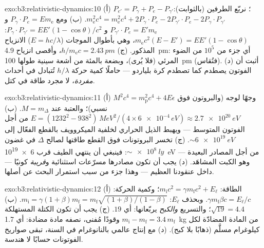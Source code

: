 \begin{solution}{exo:b3:relativistic-dynamics:10}
(أ) $P_{e'} = P_\gamma + P_e - P_{\gamma'}$؛ نربّع الطرفين
(بالثوابت): $m_{\text{e}}^2c^4 = m_{\text{e}}^2c^4 + 2P_\gamma\!
\cdot\!P_e - 2P_{\gamma'}\!\cdot\!P_e - 2P_\gamma\!\cdot\!P_{\gamma'}$.
(ب) ومع $P_\gamma\!\cdot\!P_e = E m_{\text{e}}$ و
$P_{\gamma'}\!\cdot\!P_e = E'm_{\text{e}}$ و $P_\gamma\!\cdot\!
P_{\gamma'} = EE'(1 - \cos\theta)/c^2$:
$m_{\text{e}}c^2(E - E') = EE'(1 - \cos\theta)$، وهي بأطوال الموجات
($E = hc/\lambda$) الانزياح المذكور. (ج) $h/m_{\text{e}}c =
\qty{2.43}{pm}$، وأقصى انزياح \qty{4.9}{pm}: أي جزء من $10^5$ من الضوء
المرئي (فلا يُرى)، وبضعة بالمئة من أشعة سينية طولها \qty{100}{pm}
(فتُقاس). (د) أثبت أن الفوتون يصطدم كما تصطدم كرة بلياردو ---
حاملًا كمية حركة $h/\lambda$ تُتبادل في أحداث \emph{مفردة}،
لا مجرد طاقة في كتل.
\end{solution}

\begin{solution}{exo:b3:relativistic-dynamics:11}
(أ) $M^2c^4 = m_{\text{p}}^2c^4 + 4E\epsilon$ وجهًا لوجه (والبروتون
فوق نسبي)؛ والعتبة عند $M = m_\Delta$. (ب) $E =
(1232^2 - 938^2)\,\unit{MeV^2}/(4 \times \num{6e-4}\,\unit{eV})
\approx \qty{2.7e20}{eV}$ من أجل الفوتون المتوسط --- ويهبط الذيل
الحراري لخلفية الميكروويف بالقطع الفعّال إلى
$\sim\qty{6e19}{eV}$. (ج) تخسر البروتونات فوق القطع طاقتها
لصالح $\Delta$ في غضون $\sim\qty{e8}{ly}$: فينبغي أن ينتهي الطيف قرب
\qty{6e19}{eV} من أجل المصادر البعيدة --- وهو الكبت المشاهَد.
(د) يجب أن تكون مصادرها مسرّعات استثنائية و\emph{قريبة}
كونيًا --- داخل عنقودنا العظيم --- وهذا جزء من سبب استمرار
البحث عن أصلها.
\end{solution}

\begin{solution}{exo:b3:relativistic-dynamics:12}
(أ) الطاقة: $m_{\text{i}}c^2 = \gamma m_{\text{f}}c^2 + E_\ell$؛
وكمية الحركة: $\gamma m_{\text{f}}\beta c = E_\ell/c$. وبحذف
$E_\ell$: $m_{\text{i}} = \gamma(1 + \beta)m_{\text{f}} =
m_{\text{f}}\sqrt{(1+\beta)/(1-\beta)}$. (ب) $\sqrt{19} = 4.4$؛
والتسريع \emph{والكبح} يربّعانها: أي $19$. (ج) يجب أن تكون الكتلة
المستهلكة $m_{\text{i}} - m_{\text{f}} = 3.4\,m_{\text{f}}$ وقودًا
مُفنى، نصفه مادة مضادة: أي \qty{1.7}{kg} من المادة المضادّة
لكل كيلوغرام مسلَّم (ذهابًا بلا كبح). (د) مع إنتاج عالمي بالنانوغرام
في السنة، تبقى صواريخ الفوتونات حسابًا لا هندسة.
\end{solution}

